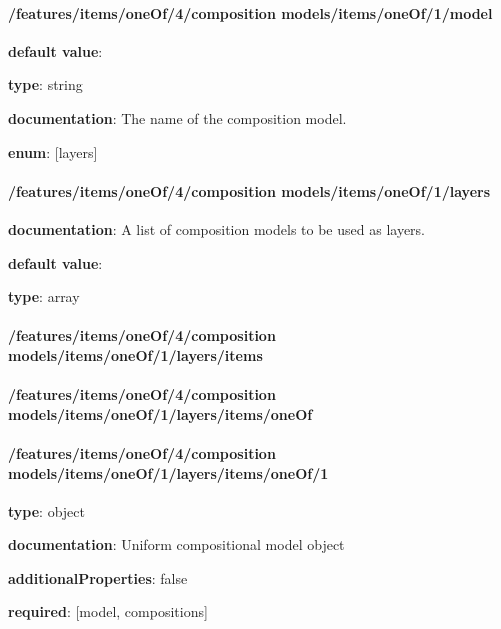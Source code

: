 \paragraph{/features/items/oneOf/4/composition models/items/oneOf/1/model} \begin{itemized}
\item {\bf default value}: 
\item {\bf type}: string
\item {\bf documentation}: The name of the composition model.
\item {\bf enum}: [layers]\end{itemized}\paragraph{/features/items/oneOf/4/composition models/items/oneOf/1/layers} \begin{itemized}
\item {\bf documentation}: A list of composition models to be used as layers.
\item {\bf default value}: 
\item {\bf type}: array
\paragraph{/features/items/oneOf/4/composition models/items/oneOf/1/layers/items} \begin{itemized}
\end{itemized}\end{itemized}\paragraph{/features/items/oneOf/4/composition models/items/oneOf/1/layers/items/oneOf} \begin{itemized}
\end{itemized}\paragraph{/features/items/oneOf/4/composition models/items/oneOf/1/layers/items/oneOf/1} \begin{itemized}
\item {\bf type}: object
\item {\bf documentation}: Uniform compositional model object
\item {\bf additionalProperties}: false
\item {\bf required}: [model, compositions]\end{itemized}
